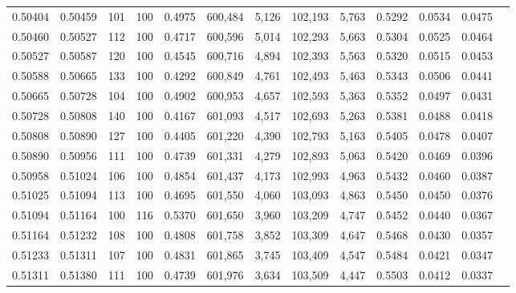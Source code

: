 \begin{tabular}{rrrrrrrrrrrrr}
0.50404 & 0.50459 &   101 & 100 &                                     0.4975 & 600,484 &   5,126 & 102,193 &   5,763 & 0.5292 & 0.0534 & 0.0475 \\
0.50460 & 0.50527 &   112 & 100 &                                     0.4717 & 600,596 &   5,014 & 102,293 &   5,663 & 0.5304 & 0.0525 & 0.0464 \\
0.50527 & 0.50587 &   120 & 100 &                                     0.4545 & 600,716 &   4,894 & 102,393 &   5,563 & 0.5320 & 0.0515 & 0.0453 \\
0.50588 & 0.50665 &   133 & 100 &                                     0.4292 & 600,849 &   4,761 & 102,493 &   5,463 & 0.5343 & 0.0506 & 0.0441 \\
0.50665 & 0.50728 &   104 & 100 &                                     0.4902 & 600,953 &   4,657 & 102,593 &   5,363 & 0.5352 & 0.0497 & 0.0431 \\
0.50728 & 0.50808 &   140 & 100 &                                     0.4167 & 601,093 &   4,517 & 102,693 &   5,263 & 0.5381 & 0.0488 & 0.0418 \\
0.50808 & 0.50890 &   127 & 100 &                                     0.4405 & 601,220 &   4,390 & 102,793 &   5,163 & 0.5405 & 0.0478 & 0.0407 \\
0.50890 & 0.50956 &   111 & 100 &                                     0.4739 & 601,331 &   4,279 & 102,893 &   5,063 & 0.5420 & 0.0469 & 0.0396 \\
0.50958 & 0.51024 &   106 & 100 &                                     0.4854 & 601,437 &   4,173 & 102,993 &   4,963 & 0.5432 & 0.0460 & 0.0387 \\
0.51025 & 0.51094 &   113 & 100 &                                     0.4695 & 601,550 &   4,060 & 103,093 &   4,863 & 0.5450 & 0.0450 & 0.0376 \\
0.51094 & 0.51164 &   100 & 116 &                                     0.5370 & 601,650 &   3,960 & 103,209 &   4,747 & 0.5452 & 0.0440 & 0.0367 \\
0.51164 & 0.51232 &   108 & 100 &                                     0.4808 & 601,758 &   3,852 & 103,309 &   4,647 & 0.5468 & 0.0430 & 0.0357 \\
0.51233 & 0.51311 &   107 & 100 &                                     0.4831 & 601,865 &   3,745 & 103,409 &   4,547 & 0.5484 & 0.0421 & 0.0347 \\
0.51311 & 0.51380 &   111 & 100 &                                     0.4739 & 601,976 &   3,634 & 103,509 &   4,447 & 0.5503 & 0.0412 & 0.0337 \\

\end{tabular}

